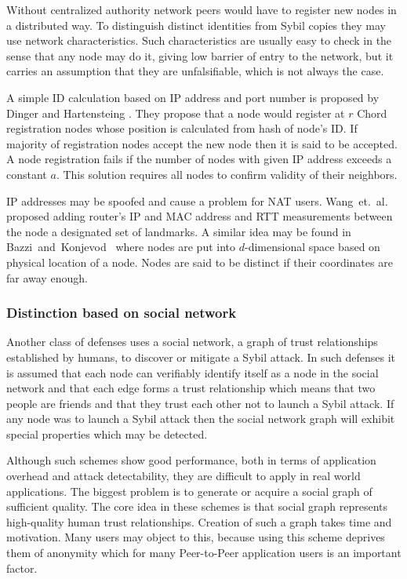   Without centralized authority network peers would have to register new nodes
  in a distributed way. To distinguish distinct identities from Sybil copies
  they may use network characteristics. Such characteristics are usually easy to
  check in the sense that any node may do it, giving low barrier of entry to the
  network, but it carries an assumption that they are unfalsifiable, which is
  not always the case.

  A simple ID calculation based on IP address and port number is proposed by
  Dinger and Hartensteing \cite{din06}. They propose that a node would
  register at $r$ Chord registration nodes whose position is calculated from
  hash of node's ID. If majority of registration nodes accept the new node then
  it is said to be accepted. A node registration fails if the number of nodes
  with given IP address exceeds a constant $a$. This solution requires all nodes
  to confirm validity of their neighbors.

  IP addresses may be spoofed and cause a problem for NAT users.
  Wang~et.~al.~\cite{wan05} proposed adding router's IP and MAC address
  and RTT measurements between the node a designated set of landmarks. A similar
  idea may be found in Bazzi~and~Konjevod~\cite{baz05} where nodes are put
  into $d$-dimensional space based on physical location of a node. Nodes are
  said to be distinct if their coordinates are far away enough.

  \subsubsection{Distinction based on social network}

  Another class of defenses uses a social network, a graph of trust
  relationships established by humans, to discover or mitigate a Sybil attack.
  In such defenses it is assumed that each node can verifiably identify itself
  as a node in the social network and that each edge forms a trust relationship
  which means that two people are friends and that they trust each other not to
  launch a Sybil attack. If any node was to launch a Sybil attack then the
  social network graph will exhibit special properties which may be detected. 

  Although such schemes show good performance, both in terms of application
  overhead and attack detectability, they are difficult to apply in real world
  applications. The biggest problem is to generate or acquire a social graph of
  sufficient quality. The core idea in these schemes is that social graph
  represents high-quality human trust relationships. Creation of such a graph
  takes time and motivation. Many users may object to this, because using this
  scheme deprives them of anonymity which for many Peer-to-Peer application
  users is an important factor.

